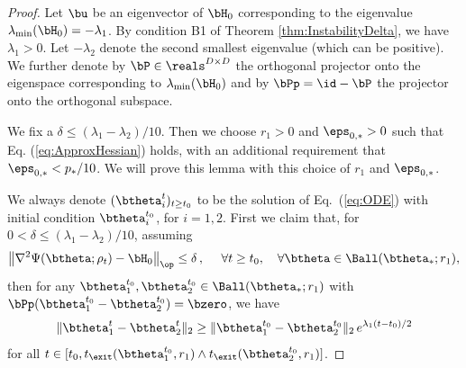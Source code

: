\documentclass[11pt]{article}
\begin{document}
\begin{proof}


Let $\bu$ be an eigenvector of $\bH_0$ corresponding to the eigenvalue $\lambda_{\rm min}(\bH_0) = -\lambda_1$. By condition {\sf B1} of Theorem \ref{thm:InstabilityDelta}, we have $\lambda_1 > 0$. Let $-\lambda_2$ denote the second smallest eigenvalue (which can be positive).
We further denote by $\bP\in\reals^{D\times D}$ the orthogonal projector onto the eigenspace
corresponding to $\lambda_{\rm min}(\bH_0)$ and  by $\bPp=\id-\bP$ the projector onto the orthogonal subspace.


We fix a $\delta \le (\lambda_1 - \lambda_2)/10$. Then we choose $r_1 > 0$ and $\eps_{0, *} > 0$ such that Eq. (\ref{eq:ApproxHessian}) holds, with an additional requirement that $\eps_{0, *} < p_* / 10$. We will prove this lemma with this choice of $r_1$ and $\eps_{0, *}$. 

We always denote $(\btheta_i^t)_{t \ge t_0}$ to be the solution of Eq.~(\ref{eq:ODE}) with initial condition $\btheta_i^{t_0}$, for $i = 1, 2$. First we claim that, for $0 < \delta \le (\lambda_1 - \lambda_2)/10$, assuming
\begin{align}\label{eqn:condition_of_claim_in_unstable_proof}
\big\|\nabla^2\Psi(\btheta; \rho_t)-\bH_0\big\|_{\op}\le\delta\,,~~~~  \forall t \ge t_0,~~~ \forall \btheta \in \Ball(\btheta_*; r_1),
\end{align}
then for any $\btheta^{t_0}_1, \btheta^{t_0}_2 \in \Ball(\btheta_*; r_1)$ with $\bPp(\btheta^{t_0}_1 -\btheta^{t_0}_2) = \bzero$, we have 
\begin{align}\label{eqn:Unstable_manifold_escape}
\| \btheta^t_1-\btheta^t_2 \|_2 \ge \| \btheta^{t_0}_1 -\btheta^{t_0}_2 \|_2 \,e^{\lambda_1 (t - t_0) / 2}
\end{align}
for all $t \in [t_0, t_{\exit}(\btheta^{t_0}_1,r_1)\wedge t_{\exit}(\btheta^{t_0}_2,r_1)]$.  


\end{proof}
\end{document}
